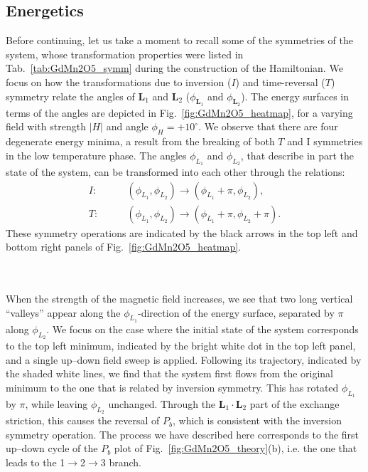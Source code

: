 \subsection{Energetics}
Before continuing, let us take a moment to recall some of the symmetries of the system, whose transformation properties were listed in Tab.~\ref{tab:GdMn2O5_symm} during the construction of the Hamiltonian.
We focus on how the transformations due to inversion ($I$) and time-reversal ($T$) symmetry relate the angles of $\bm L_1$ and $\bm L_2$ ($\phi_{\bm L_1}$ and $\phi_{\bm L_2}$).
The energy surfaces in terms of the angles are depicted in Fig.~\ref{fig:GdMn2O5_heatmap}, for a varying field with strength $|H|$ and angle $\phi_H = +10^\circ$.
We observe that there are four degenerate energy minima, a result from the breaking of both $T$ and I symmetries in the low temperature phase.
The angles $\phi_{L_1}$ and $\phi_{L_2}$, that describe in part the state of the system, can be transformed into each other through the relations:
\begin{align}
	I:\qquad &(\phi_{L_1}, \phi_{L_2}) \rightarrow (\phi_{L_1}+\pi, \phi_{L_2}),\\
	T:\qquad &(\phi_{L_1}, \phi_{L_2})\rightarrow(\phi_{L_1}+\pi, \phi_{L_2}+\pi).
\end{align}
These symmetry operations are indicated by the black arrows in the top left and bottom right panels of Fig.~\ref{fig:GdMn2O5_heatmap}.
\begin{figure*}[h!]
	\centering
	\caption{{\bf Energy surfaces in terms of $(\phi_{L_1}, \phi_{L_2})$ for $\phi_H =+10^\circ$.} The shaded dots denote the four degenerate minima, related by time-reversal ($T$) and inversion ($I$) symmetry operations indicated by the black arrows. The full white dot corresponds to the example situation discussed in the main text. An indication of its trajectory during a double up--down field sweep is given by the shaded lines.\label{fig:GdMn2O5_heatmap}}
\end{figure*}
\\\\
When the strength of the magnetic field increases, we see that two long vertical ``valleys'' appear along the $\phi_{L_1}$-direction of the energy surface, separated by $\pi$ along $\phi_{L_2}$.
We focus on the case where the initial state of the system corresponds to the top left minimum, indicated by the bright white dot in the top left panel, and a single up--down field sweep is applied.
Following its trajectory, indicated by the shaded white lines, we find that the system first flows from the original minimum to the one that is related by inversion symmetry.
This has rotated $\phi_{L_1}$ by $\pi$, while leaving $\phi_{L_2}$ unchanged.
Through the $\bm L_1 \cdot \bm L_2$ part of the exchange striction, this causes the reversal of $P_b$, which is consistent with the inversion symmetry operation.
The process we have described here corresponds to the first up--down cycle of the $P_b$ plot of Fig.~\ref{fig:GdMn2O5_theory}(b), i.e. the one that leads to the 1$\rightarrow$2$\rightarrow$3 branch.

